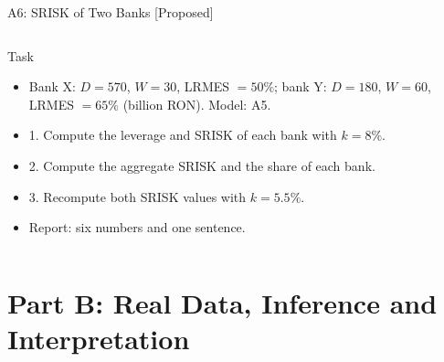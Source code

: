 \begin{frame}{A6: SRISK of Two Banks [Proposed]}
\propsub
\itemsize{\scriptsize}
\begin{columns}[T]
\begin{column}{\taskw}
\begin{block}{Task}
\begin{itemize}
    \item Bank X: $D = 570$, $W = 30$, LRMES $= 50\%$; bank Y: $D = 180$, $W = 60$, LRMES $= 65\%$ (billion RON). Model: A5.
    \item 1. Compute the leverage and SRISK of each bank with $k = 8\%$.
    \item 2. Compute the aggregate SRISK and the share of each bank.
    \item 3. Recompute both SRISK values with $k = 5.5\%$.
    \item Report: six numbers and one sentence.
\end{itemize}
\end{block}
\end{column}
\begin{column}{\solw}
\end{column}
\end{columns}
\end{frame}


\section{Part B: Real Data, Inference and Interpretation}

